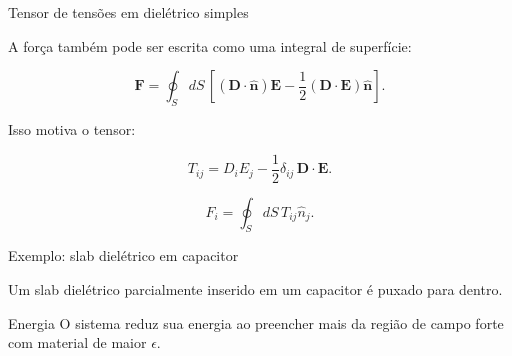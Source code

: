 \documentclass[aspectratio=169]{beamer}
\begin{document}
\begin{frame}{Tensor de tensões em dielétrico simples}

\small

A força também pode ser escrita como uma integral de superfície:

\begin{eqbox}
\begin{equation}
\mathbf F
=
\oint_S dS\,
\left[
(\mathbf D\cdot\hat{\mathbf n})\mathbf E
-
\frac12
(\mathbf D\cdot\mathbf E)\hat{\mathbf n}
\right].
\tag{6.132}
\label{eq:forca-stress-superficie}
\end{equation}
\end{eqbox}

Isso motiva o tensor:

\begin{eqbox}
\begin{equation}
T_{ij}
=
D_iE_j
-
\frac12\delta_{ij}\,\mathbf D\cdot\mathbf E.
\tag{6.133}
\label{eq:tensor-stress-dieletrico}
\end{equation}
\end{eqbox}

\[
F_i=\oint_S dS\,T_{ij}\hat n_j.
\tag{6.134}
\]

\end{frame}

\begin{frame}{Exemplo: slab dielétrico em capacitor}

\small

Um slab dielétrico parcialmente inserido em um capacitor é puxado para dentro.

\begin{center}
\end{center}

\begin{mybox}{Energia}
O sistema reduz sua energia ao preencher mais da região de campo forte com
material de maior \(\epsilon\).
\end{mybox}

\end{frame}
\end{document}
